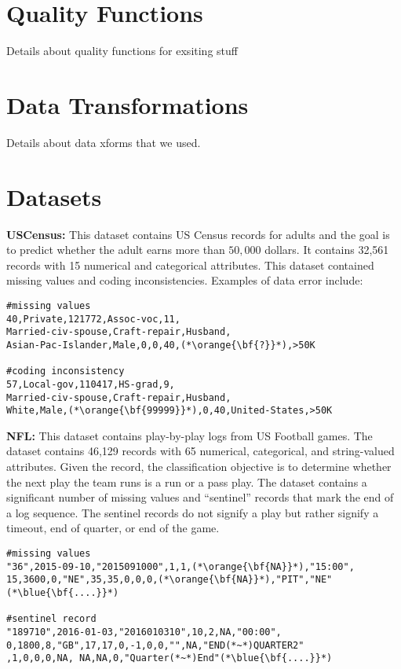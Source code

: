 \appendix

\section{Quality Functions}
Details about quality functions for exsiting stuff

\section{Data Transformations}

Details about data xforms that we used.

\section{Datasets}
\vspace{0.5em}\noindent\textbf{USCensus: } This dataset contains US Census records for adults and the goal is to predict  whether the adult earns more than $50,000$ dollars. It contains 32,561 records with 15 numerical and categorical attributes. This dataset contained missing values and coding inconsistencies.
Examples of data error include:
\begin{lstlisting}
#missing values
40,Private,121772,Assoc-voc,11,
Married-civ-spouse,Craft-repair,Husband, 
Asian-Pac-Islander,Male,0,0,40,(*\orange{\bf{?}}*),>50K

#coding inconsistency
57,Local-gov,110417,HS-grad,9,
Married-civ-spouse,Craft-repair,Husband,
White,Male,(*\orange{\bf{99999}}*),0,40,United-States,>50K
\end{lstlisting}


\vspace{0.5em}\noindent\textbf{NFL: } This dataset contains play-by-play logs from US Football games. The dataset contains 46,129 records with 65 numerical, categorical, and string-valued attributes. Given the record, the classification objective is to determine whether the next play the team runs is a run or a pass play.
The dataset contains a significant number of missing values and ``sentinel'' records that mark the end of a log sequence. The sentinel records do not signify a play but rather signify a timeout, end of quarter, or end of the game.
\begin{lstlisting}
#missing values
"36",2015-09-10,"2015091000",1,1,(*\orange{\bf{NA}}*),"15:00",
15,3600,0,"NE",35,35,0,0,0,(*\orange{\bf{NA}}*),"PIT","NE"(*\blue{\bf{....}}*)

#sentinel record
"189710",2016-01-03,"2016010310",10,2,NA,"00:00",
0,1800,8,"GB",17,17,0,-1,0,0,"",NA,"END(*~*)QUARTER2"
,1,0,0,0,NA, NA,NA,0,"Quarter(*~*)End"(*\blue{\bf{....}}*)
\end{lstlisting}




